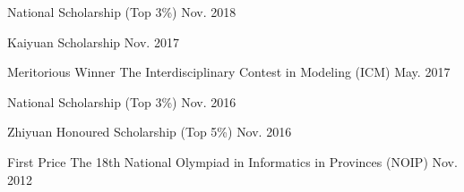 
\begin{cvhonors}

  \cvhonortop
	{National Scholarship} %
	{(Top 3\%)} %
	{} %
	{Nov. 2018} %

  \cvhonortop
	{Kaiyuan Scholarship} %
	{} %
	{} %
	{Nov. 2017} %

  \cvhonor
    {Meritorious Winner} %
    {The Interdisciplinary Contest in Modeling (ICM)} %
    {} %
    {May. 2017} %

  \cvhonortop
    {National Scholarship } %
    {(Top 3\%)} %
    {} %
    {Nov. 2016} %

  \cvhonortop
    {Zhiyuan Honoured Scholarship} %
    {(Top 5\%)} %
    {} %
    {Nov. 2016} %

  \cvhonor
    {First Price} %
    {The 18th National Olympiad in Informatics in Provinces (NOIP)} %
    {} %
    {Nov. 2012} %


\end{cvhonors}

